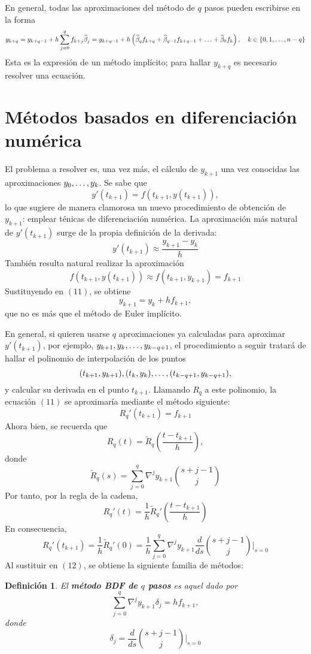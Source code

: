 \documentclass[11pt]{report}
\theoremstyle{mytheorem}
\theoremstyle{mydefinition}
\newtheorem{definition}{Definición}
\theoremstyle{myexample}
\newenvironment{cdefinition} %
  {\begin{mdframed}[
        linewidth=3pt,
        linecolor=c1,
        bottomline=false,
        topline=false,
        rightline=false,
        innerrightmargin=0pt,
        innertopmargin=0pt,
        innerbottommargin=0pt,
        innerleftmargin=1em, %
        skipabove=\baselineskip]
    \begin{definition}}
  {\end{definition}\end{mdframed}}
\newcommand{\mybf}[1]{\boldmath\textbf{\color{c1}#1}\unboldmath}
\begin{document}
En general, todas las aproximaciones del método de $q$ pasos pueden escribirse en la forma
\[y_{k+q} = y_{k+q-1}+h\sum_{j=0}^{q}f_{k+j}\widetilde{\beta}_j = y_{k+q-1}+h\left(\widetilde{\beta}_{q}f_{k+q}+\widetilde{\beta}_{q-1}f_{k+q-1}+\mathellipsis+\widetilde{\beta}_0f_k\right), \quad k \in \{0,1,\mathellipsis,n-q\}\]
Esta es la expresión de un método implícito; para hallar $y_{k+q}$ es necesario resolver una ecuación.

\section{Métodos basados en diferenciación numérica}

El problema a resolver es, una vez más, el cálculo de $y_{k+1}$ una vez conocidas las aproximaciones $y_0,\mathellipsis,y_k$. Se sabe que \begin{equation}y'(t_{k+1})=f(t_{k+1},y(t_{k+1})),\end{equation}
lo que sugiere de manera clamorosa un nuevo procedimiento de obtención de $y_{k+1}$: emplear ténicas de diferenciación numérica. La aproximación más natural de $y'(t_{k+1})$ surge de la propia definición de la derivada:
\[y'(t_{k+1}) \approx \frac{y_{k+1}-y_k}{h}\]
También resulta natural realizar la aproximación
\[f(t_{k+1},y(t_{k+1})) \approx f(t_{k+1},y_{k+1}) = f_{k+1}\]
Sustituyendo en $(11)$, se obtiene
\[y_{k+1} = y_k +hf_{k+1},\]
que no es más que el método de Euler implícito.

En general, si quieren usarse $q$ aproximaciones ya calculadas para aproximar $y'(t_{k+1})$, por ejemplo, $y_{k+1},y_k,\mathellipsis,y_{k-q+1}$, el procedimiento a seguir tratará de hallar el polinomio de interpolación de los puntos
\[(t_{k+1},y_{k+1}),(t_k,y_k),\mathellipsis,(t_{k-q+1},y_{k-q+1}),\]
y calcular su derivada en el punto $t_{k+1}$. Llamando $R_q$ a este polinomio, la ecuación $(11)$ se aproximaría mediante el método siguiente:
\begin{equation}R_q'(t_{k+1}) = f_{k+1}\end{equation}
Ahora bien, se recuerda que
\[R_q(t)=\widetilde{R}_q\left(\frac{t-t_{k+1}}{h}\right),\]
donde
\[\widetilde{R}_q(s)=\sum_{j=0}^q\nabla^jy_{k+1}\binom{s+j-1}{j}\]
Por tanto, por la regla de la cadena,
\[R_q'(t) = \frac{1}{h}\widetilde{R}_q'\left(\frac{t-t_{k+1}}{h}\right)\]
En consecuencia,
\[R_q'(t_{k+1}) = \frac{1}{h}\widetilde{R}_q'(0) = \frac{1}{h}\sum_{j=0}^q\nabla^jy_{k+1}\frac{d}{ds}\binom{s+j-1}{j}\Biggr|_{s=0}\]
Al sustituir en $(12)$, se obtiene la siguiente familia de métodos:
\begin{cdefinition}
El \mybf{método BDF de $q$ pasos} es aquel dado por
\[\sum_{j=0}^q\nabla^jy_{k+1}\delta_j = hf_{k+1},\]
donde
\[\delta_j = \frac{d}{ds}\binom{s+j-1}{j}\Biggr|_{s=0}\]
\end{cdefinition}
\end{document}
